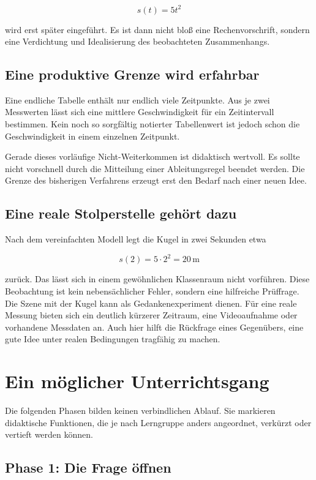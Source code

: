 \documentclass[11pt,a4paper]{article}
\begin{document}
\[
  s(t)=5t^2
\]

wird erst später eingeführt. Es ist dann nicht bloß eine Rechenvorschrift,
sondern eine Verdichtung und Idealisierung des beobachteten Zusammenhangs.

\subsection{Eine produktive Grenze wird erfahrbar}

Eine endliche Tabelle enthält nur endlich viele Zeitpunkte. Aus je zwei
Messwerten lässt sich eine mittlere Geschwindigkeit für ein Zeitintervall
bestimmen. Kein noch so sorgfältig notierter Tabellenwert ist jedoch schon die
Geschwindigkeit in einem einzelnen Zeitpunkt.

Gerade dieses vorläufige Nicht-Weiterkommen ist didaktisch wertvoll. Es sollte
nicht vorschnell durch die Mitteilung einer Ableitungsregel beendet werden. Die
Grenze des bisherigen Verfahrens erzeugt erst den Bedarf nach einer neuen Idee.

\subsection{Eine reale Stolperstelle gehört dazu}

Nach dem vereinfachten Modell legt die Kugel in zwei Sekunden etwa

\[
  s(2)=5\cdot 2^2=20\,\mathrm{m}
\]

zurück. Das lässt sich in einem gewöhnlichen Klassenraum nicht vorführen. Diese
Beobachtung ist kein nebensächlicher Fehler, sondern eine hilfreiche
Prüffrage. Die Szene mit der Kugel kann als Gedankenexperiment dienen. Für eine
reale Messung bieten sich ein deutlich kürzerer Zeitraum, eine Videoaufnahme
oder vorhandene Messdaten an. Auch hier hilft die Rückfrage eines Gegenübers,
eine gute Idee unter realen Bedingungen tragfähig zu machen.


\section{Ein möglicher Unterrichtsgang}

Die folgenden Phasen bilden keinen verbindlichen Ablauf. Sie markieren
didaktische Funktionen, die je nach Lerngruppe anders angeordnet, verkürzt oder
vertieft werden können.

\subsection{Phase 1: Die Frage öffnen}
\end{document}

